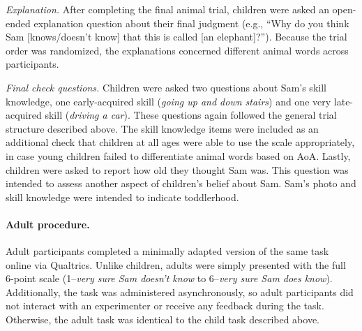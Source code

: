 \documentclass[10pt, letterpaper]{article}
\begin{document}
\emph{Explanation.} After completing the final animal trial, children
were asked an open-ended explanation question about their final judgment
(e.g., ``Why do you think Sam {[}knows/doesn't know{]} that this is
called {[}an elephant{]}?''). Because the trial order was randomized,
the explanations concerned different animal words across participants.

\emph{Final check questions.} Children were asked two questions about
Sam's skill knowledge, one early-acquired skill (\emph{going up and down
stairs}) and one very late-acquired skill (\emph{driving a car}). These
questions again followed the general trial structure described above.
The skill knowledge items were included as an additional check that
children at all ages were able to use the scale appropriately, in case
young children failed to differentiate animal words based on AoA.
Lastly, children were asked to report how old they thought Sam was. This
question was intended to assess another aspect of children's belief
about Sam. Sam's photo and skill knowledge were intended to indicate
toddlerhood.

\hypertarget{adult-procedure.}{%
\paragraph{Adult procedure.}\label{adult-procedure.}}

Adult participants completed a minimally adapted version of the same
task online via Qualtrics. Unlike children, adults were simply presented
with the full 6-point scale (1--\emph{very sure Sam doesn't know} to
6--\emph{very sure Sam does know}). Additionally, the task was
administered asynchronously, so adult participants did not interact with
an experimenter or receive any feedback during the task. Otherwise, the
adult task was identical to the child task described above.
\end{document}
